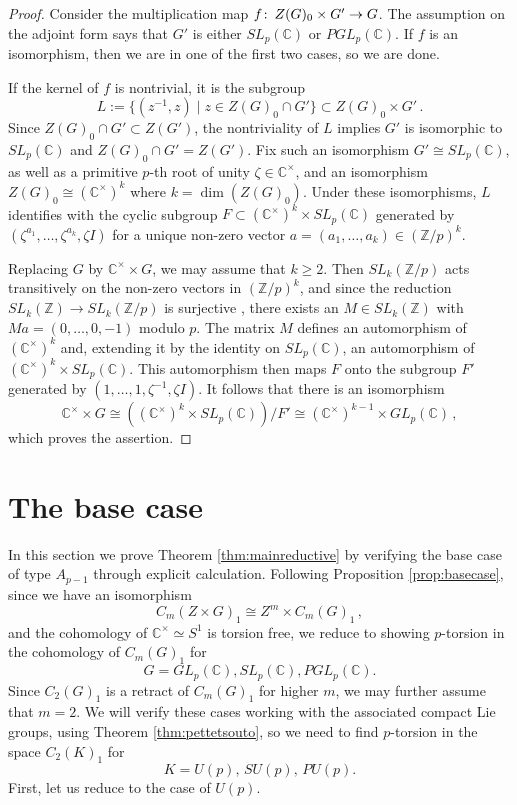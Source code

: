 \documentclass[oneside, 12pt, a4paper]{amsart}
\numberwithin{equation}{section}
\newcommand{\Z}{\mathbb{Z}}
\newcommand{\C}{\mathbb{C}}
\newcommand{\co}{\colon\thinspace}
\theoremstyle{plain}
\theoremstyle{definition}
\theoremstyle{remark}
\begin{document}
\begin{proof}
Consider the multiplication map $f\co Z(G)_0\times G'\to G$. The assumption on the adjoint form says that $G'$ is either $SL_p(\C)$ or $PGL_p(\C)$. If $f$ is an isomorphism, then we are in one of the first two cases, so we are done.

If the kernel of $f$ is nontrivial, it is the subgroup
\[
L:=\{(z^{-1},z)\mid z\in Z(G)_0\cap G'\}\subset Z(G)_0\times G'\,.
\]
Since $Z(G)_0\cap G'\subset Z(G')$, the nontriviality of $L$ implies $G'$ is isomorphic to $SL_p(\C)$ and $Z(G)_0\cap G'=Z(G')$. Fix such an isomorphism $G'\cong SL_p(\C)$, as well as a primitive $p$-th root of unity $\zeta\in \C^\times$, and an isomorphism $Z(G)_0\cong (\C^\times)^k$ where $k=\dim(Z(G)_0)$. Under these isomorphisms, $L$ identifies with the cyclic subgroup $F\subset (\C^\times)^k\times SL_p(\C)$ generated by $(\zeta^{a_1},\dots,\zeta^{a_k},\zeta I)$ for a unique non-zero vector $a=(a_1,\dots,a_k)\in (\Z/p)^k$.

Replacing $G$ by $\C^\times\times  G$, we may assume that $k\geq 2$. Then $SL_k(\Z/p)$ acts transitively on the non-zero vectors in $(\Z/p)^k$, and since the reduction $SL_k(\Z) \to SL_k(\Z/p)$ is surjective \cite[Lemma 1.38]{Sh71}, there exists an $M\in SL_k(\Z)$ with $Ma=(0,\dots,0,-1)$ modulo $p$. The matrix $M$ defines an automorphism of $(\C^\times)^k$ and, extending it by the identity on $SL_p(\C)$, an automorphism of $(\C^\times)^k\times SL_p(\C)$. This automorphism then maps $F$ onto the subgroup $F'$ generated by $(1,\dots,1,\zeta^{-1},\zeta I)$. It follows that there is an isomorphism
\[
\C^\times \times G \cong ((\C^\times)^k\times SL_p(\C))/F' \cong (\C^\times)^{k-1} \times GL_p(\C)\,,
\]
which proves the assertion.
\end{proof}


\section{The base case} \label{sec:basecase}

In this section we prove Theorem \ref{thm:mainreductive} by verifying the base case of type $A_{p-1}$ through explicit calculation. Following Proposition \ref{prop:basecase}, since we have an isomorphism \[C_m(Z\times G)_1\cong Z^m\times C_m(G)_1\,,\] and the cohomology of $\mathbb{C}^\times\simeq S^1$ is torsion free, we reduce to showing $p$-torsion in the cohomology of $C_m(G)_1$ for \[G=GL_p(\C),SL_p(\C),PGL_p(\C).\] Since $C_2(G)_1$ is a retract of $C_m(G)_1$ for higher $m$, we may further assume that $m=2$. We will verify these cases working with the associated compact Lie groups, using Theorem \ref{thm:pettetsouto}, so we need to find $p$-torsion in the space $C_2(K)_1$ for \[K=U(p),\,SU(p),\,PU(p).\] First, let us reduce to the case of $U(p)$.
\end{document}
